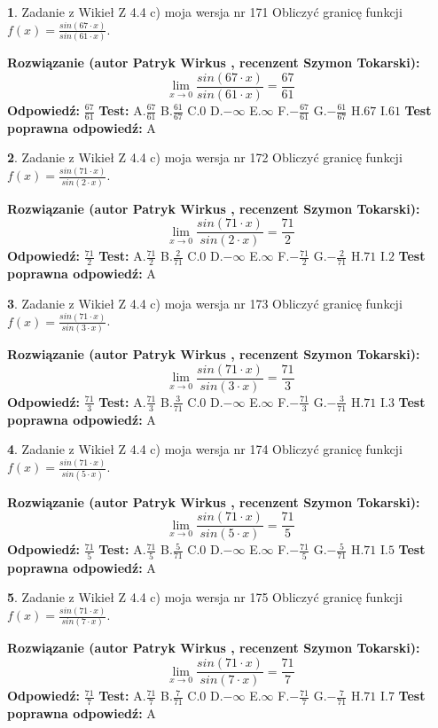 \documentclass[12pt, a4paper]{article}
\theoremstyle{definition} %
\newtheorem{zad}{}
\newcommand{\zadStart}[1]{\begin{zad}#1\newline}
\newcommand{\zadStop}{\end{zad}}
\newcommand{\rozwStart}[2]{\noindent \textbf{Rozwiązanie (autor #1 , recenzent #2): }\newline}
\newcommand{\rozwStop}{\newline}
\newcommand{\odpStart}{\noindent \textbf{Odpowiedź:}\newline}
\newcommand{\odpStop}{\newline}
\newcommand{\testStart}{\noindent \textbf{Test:}\newline}
\newcommand{\testStop}{\newline}
\newcommand{\kluczStart}{\noindent \textbf{Test poprawna odpowiedź:}\newline}
\newcommand{\kluczStop}{\newline}
\begin{document}
\zadStart{Zadanie z Wikieł Z 4.4 c) moja wersja nr 171}
Obliczyć granicę funkcji $f(x)=\frac{sin(67\cdot x)}{sin(61\cdot x)}$.
\zadStop
\rozwStart{Patryk Wirkus}{Szymon Tokarski}
$$\lim\limits_{x\to 0}\frac{sin(67\cdot x)}{sin(61\cdot x)}=
\frac{67}{61}$$
\rozwStop
\odpStart
$\frac{67}{61}$
\odpStop
\testStart
A.$\frac{67}{61}$
B.$\frac{61}{67}$
C.$0$
D.$-\infty$
E.$\infty$
F.$-\frac{67}{61}$
G.$-\frac{61}{67}$
H.$67$
I.$61$
\testStop
\kluczStart
A
\kluczStop



\zadStart{Zadanie z Wikieł Z 4.4 c) moja wersja nr 172}
Obliczyć granicę funkcji $f(x)=\frac{sin(71\cdot x)}{sin(2\cdot x)}$.
\zadStop
\rozwStart{Patryk Wirkus}{Szymon Tokarski}
$$\lim\limits_{x\to 0}\frac{sin(71\cdot x)}{sin(2\cdot x)}=
\frac{71}{2}$$
\rozwStop
\odpStart
$\frac{71}{2}$
\odpStop
\testStart
A.$\frac{71}{2}$
B.$\frac{2}{71}$
C.$0$
D.$-\infty$
E.$\infty$
F.$-\frac{71}{2}$
G.$-\frac{2}{71}$
H.$71$
I.$2$
\testStop
\kluczStart
A
\kluczStop



\zadStart{Zadanie z Wikieł Z 4.4 c) moja wersja nr 173}
Obliczyć granicę funkcji $f(x)=\frac{sin(71\cdot x)}{sin(3\cdot x)}$.
\zadStop
\rozwStart{Patryk Wirkus}{Szymon Tokarski}
$$\lim\limits_{x\to 0}\frac{sin(71\cdot x)}{sin(3\cdot x)}=
\frac{71}{3}$$
\rozwStop
\odpStart
$\frac{71}{3}$
\odpStop
\testStart
A.$\frac{71}{3}$
B.$\frac{3}{71}$
C.$0$
D.$-\infty$
E.$\infty$
F.$-\frac{71}{3}$
G.$-\frac{3}{71}$
H.$71$
I.$3$
\testStop
\kluczStart
A
\kluczStop



\zadStart{Zadanie z Wikieł Z 4.4 c) moja wersja nr 174}
Obliczyć granicę funkcji $f(x)=\frac{sin(71\cdot x)}{sin(5\cdot x)}$.
\zadStop
\rozwStart{Patryk Wirkus}{Szymon Tokarski}
$$\lim\limits_{x\to 0}\frac{sin(71\cdot x)}{sin(5\cdot x)}=
\frac{71}{5}$$
\rozwStop
\odpStart
$\frac{71}{5}$
\odpStop
\testStart
A.$\frac{71}{5}$
B.$\frac{5}{71}$
C.$0$
D.$-\infty$
E.$\infty$
F.$-\frac{71}{5}$
G.$-\frac{5}{71}$
H.$71$
I.$5$
\testStop
\kluczStart
A
\kluczStop



\zadStart{Zadanie z Wikieł Z 4.4 c) moja wersja nr 175}
Obliczyć granicę funkcji $f(x)=\frac{sin(71\cdot x)}{sin(7\cdot x)}$.
\zadStop
\rozwStart{Patryk Wirkus}{Szymon Tokarski}
$$\lim\limits_{x\to 0}\frac{sin(71\cdot x)}{sin(7\cdot x)}=
\frac{71}{7}$$
\rozwStop
\odpStart
$\frac{71}{7}$
\odpStop
\testStart
A.$\frac{71}{7}$
B.$\frac{7}{71}$
C.$0$
D.$-\infty$
E.$\infty$
F.$-\frac{71}{7}$
G.$-\frac{7}{71}$
H.$71$
I.$7$
\testStop
\kluczStart
A
\kluczStop
\end{document}
